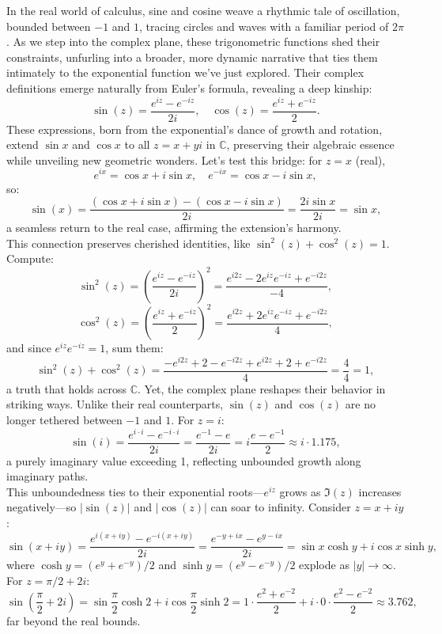 \noindent In the real world of calculus, sine and cosine weave a rhythmic tale of oscillation, bounded between $-1$ and $1$, tracing circles and waves with a familiar period of $2\pi$. As we step into the complex plane, these trigonometric functions shed their constraints, unfurling into a broader, more dynamic narrative that ties them intimately to the exponential function we’ve just explored. Their complex definitions emerge naturally from Euler’s formula, revealing a deep kinship:
\[
\sin(z) = \frac{e^{iz} - e^{-iz}}{2i}, \quad \cos(z) = \frac{e^{iz} + e^{-iz}}{2}.
\]
These expressions, born from the exponential’s dance of growth and rotation, extend $\sin x$ and $\cos x$ to all $z = x + yi$ in $\mathbb{C}$, preserving their algebraic essence while unveiling new geometric wonders. Let’s test this bridge: for $z = x$ (real),
\[
e^{ix} = \cos x + i \sin x, \quad e^{-ix} = \cos x - i \sin x,
\]
so:
\[
\sin(x) = \frac{(\cos x + i \sin x) - (\cos x - i \sin x)}{2i} = \frac{2i \sin x}{2i} = \sin x,
\]
a seamless return to the real case, affirming the extension’s harmony. \\

\noindent This connection preserves cherished identities, like $\sin^2(z) + \cos^2(z) = 1$. Compute:
\[
\sin^2(z) = \left( \frac{e^{iz} - e^{-iz}}{2i} \right)^2 = \frac{e^{i2z} - 2 e^{iz} e^{-iz} + e^{-i2z}}{-4},
\]
\[
\cos^2(z) = \left( \frac{e^{iz} + e^{-iz}}{2} \right)^2 = \frac{e^{i2z} + 2 e^{iz} e^{-iz} + e^{-i2z}}{4},
\]
and since $e^{iz} e^{-iz} = 1$, sum them:
\[
\sin^2(z) + \cos^2(z) = \frac{-e^{i2z} + 2 - e^{-i2z} + e^{i2z} + 2 + e^{-i2z}}{4} = \frac{4}{4} = 1,
\]
\noindent a truth that holds across $\mathbb{C}$. Yet, the complex plane reshapes their behavior in striking ways. Unlike their real counterparts, $\sin(z)$ and $\cos(z)$ are no longer tethered between $-1$ and $1$. For $z = i$:
\[
\sin(i) = \frac{e^{i \cdot i} - e^{-i \cdot i}}{2i} = \frac{e^{-1} - e}{2i} = i \frac{e - e^{-1}}{2} \approx i \cdot 1.175,
\]
\noindent a purely imaginary value exceeding 1, reflecting unbounded growth along imaginary paths. \\

\noindent This unboundedness ties to their exponential roots—$e^{iz}$ grows as $\Im(z)$ increases negatively—so $|\sin(z)|$ and $|\cos(z)|$ can soar to infinity. Consider $z = x + i y$:
\[
\sin(x + i y) = \frac{e^{i(x + i y)} - e^{-i(x + i y)}}{2i} = \frac{e^{-y + ix} - e^{y - ix}}{2i} = \sin x \cosh y + i \cos x \sinh y,
\]
\noindent where $\cosh y = (e^y + e^{-y})/2$ and $\sinh y = (e^y - e^{-y})/2$ explode as $|y| \to \infty$. For $z = \pi/2 + 2i$:
\[
\sin\left(\frac{\pi}{2} + 2i\right) = \sin \frac{\pi}{2} \cosh 2 + i \cos \frac{\pi}{2} \sinh 2 = 1 \cdot \frac{e^2 + e^{-2}}{2} + i \cdot 0 \cdot \frac{e^2 - e^{-2}}{2} \approx 3.762,
\]
\noindent far beyond the real bounds. \\

